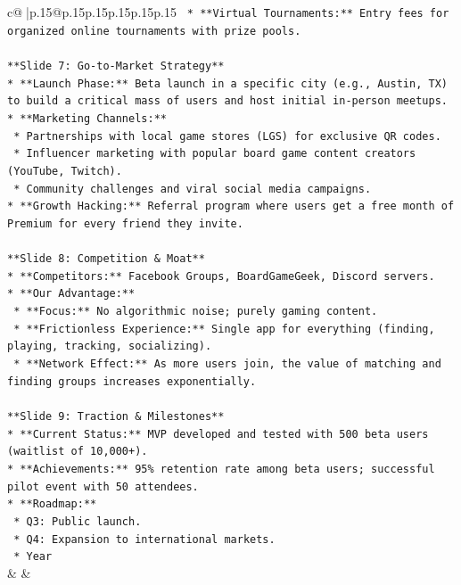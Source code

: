 \documentclass{article}
\begin{document}
{\begin{supertabular}{c@{$\;$}|p{.15\linewidth}@{}p{.15\linewidth}p{.15\linewidth}p{.15\linewidth}p{.15\linewidth}p{.15\linewidth}}
{{{\texttt{    *   **Virtual Tournaments:** Entry fees for organized online tournaments with prize pools.} \\
\\ 
\texttt{**Slide 7: Go{-}to{-}Market Strategy**} \\
\texttt{*   **Launch Phase:** Beta launch in a specific city (e.g., Austin, TX) to build a critical mass of users and host initial in{-}person meetups.} \\
\texttt{*   **Marketing Channels:**} \\
\texttt{    *   Partnerships with local game stores (LGS) for exclusive QR codes.} \\
\texttt{    *   Influencer marketing with popular board game content creators (YouTube, Twitch).} \\
\texttt{    *   Community challenges and viral social media campaigns.} \\
\texttt{*   **Growth Hacking:** Referral program where users get a free month of Premium for every friend they invite.} \\
\\ 
\texttt{**Slide 8: Competition \& Moat**} \\
\texttt{*   **Competitors:** Facebook Groups, BoardGameGeek, Discord servers.} \\
\texttt{*   **Our Advantage:**} \\
\texttt{    *   **Focus:** No algorithmic noise; purely gaming content.} \\
\texttt{    *   **Frictionless Experience:** Single app for everything (finding, playing, tracking, socializing).} \\
\texttt{    *   **Network Effect:** As more users join, the value of matching and finding groups increases exponentially.} \\
\\ 
\texttt{**Slide 9: Traction \& Milestones**} \\
\texttt{*   **Current Status:** MVP developed and tested with 500 beta users (waitlist of 10,000+).} \\
\texttt{*   **Achievements:** 95\% retention rate among beta users; successful pilot event with 50 attendees.} \\
\texttt{*   **Roadmap:**} \\
\texttt{    *   Q3: Public launch.} \\
\texttt{    *   Q4: Expansion to international markets.} \\
\texttt{    *   Year} \\
            }
        }
    }
    & & \\ \\


\end{supertabular}}
\end{document}
